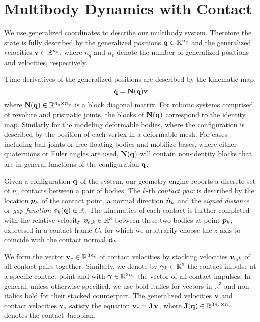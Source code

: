 \section{Multibody Dynamics with Contact}
\label{sec:multibody_dynamics_with_contact}

We use generalized coordinates to describe our multibody system. Therefore the
state is fully described by the generalized positions
${\mathbf{q}}\in\mathbb{R}^{n_q}$ and the generalized velocities
${\mathbf{v}}\in\mathbb{R}^{n_v}$, where $n_q$ and $n_v$ denote the number of
generalized positions and velocities, respectively.

Time derivatives of the generalized positions are described by the kinematic map
\begin{equation}
	\dot{\mf{q}} = \mf{N}(\mf{q})\mf{v}
	\label{eq:kinematic_map}
\end{equation}
where ${\mathbf{N}}({\mathbf{q}})\in\mathbb{R}^{n_q\times n_v}$ is a block diagonal matrix.
For robotic systems comprised of revolute and prismatic joints, the blocks of
${\mathbf{N}}({\mathbf{q}})$ correspond to the identity map. Similarly for the modeling
deformable bodies, where the configuration is described by the position of each
vertex in a deformable mesh. For cases including ball joints or free floating
bodies and mobilize bases, where either quaternions or Euler angles are used,
${\mathbf{N}}({\mathbf{q}})$ will contain non-identity blocks that are in general functions
of the configuration ${\mathbf{q}}$.

Given a configuration ${\mathbf{q}}$ of the system, our geometry engine reports a
discrete set of $n_c$ contacts between a pair of bodies. The $k\text{-th}$
\emph{contact pair} is described by the location ${\bm{p}}_k$ of the contact
point, a normal direction $\hat{{\bm{n}}}_k$ and the \emph{signed distance} or
\emph{gap function} $\phi_k({\mathbf{q}})\in\mathbb{R}$. The kinematics of each
contact is further completed with the relative velocity
${\bm{v}}_{c,k}\in\mathbb{R}^3$ between these two bodies at point ${\bm{p}}_k$,
expressed in a contact frame $C_k$ for which we arbitrarily choose the
$z\text{-axis}$ to coincide with the contact normal $\hat{{\bm{n}}}_k$.

We form the vector ${\mathbf{v}}_{c}\in\mathbb{R}^{3n_c}$ of contact velocities by
stacking velocities ${\bm{v}}_{c,k}$ of all contact pairs together. Similarly, we
denote by ${\bm\gamma}_k\in\mathbb{R}^3$ the contact impulse at a specific contact
point and with ${\bm\gamma}\in\mathbb{R}^{3n_c}$ the vector of all contact impulses.
In general, unless otherwise specified, we use bold italics for vectors in
$\mathbb{R}^3$ and non-italics bold for their stacked counterpart. The
generalized velocities ${\mathbf{v}}$ and contact velocities ${\mathbf{v}}_c$ satisfy the
equation ${\mathbf{v}}_c={\mathbf{J}}\,{\mathbf{v}}$, where
${\mathbf{J}}({\mathbf{q}})\in\mathbb{R}^{3n_c\times n_v}$ denotes the contact Jacobian.

